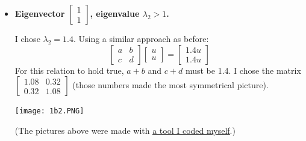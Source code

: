 \documentclass[11pt]{article}
\begin{document}
\begin{enumerate}[label=\textbf{\arabic*.}]
{\begin{enumerate}[label=\textbf{(\alph*)}]
{\begin{itemize}
{\begin{center}
                            \end{center}
                        }
                        \item{
                            \textbf{\boldmath Eigenvector $\begin{bmatrix}1 \\ 1\end{bmatrix}$, eigenvalue $\lambda_2>1$.}
                            \par
                            I chose $\lambda_2=1.4$. Using a similar approach as before:
                            \begin{equation*}
                                \begin{bmatrix}
                                    a & b \\
                                    c & d
                                \end{bmatrix}
                                \begin{bmatrix}
                                    u \\ u
                                \end{bmatrix}
                                =
                                \begin{bmatrix}
                                    1.4u \\ 1.4u
                                \end{bmatrix}
                            \end{equation*}
                            For this relation to hold true, $a+b$ and $c+d$ must be 1.4. I chose the matrix $\begin{bmatrix}1.08 & 0.32 \\ 0.32 & 1.08\end{bmatrix}$ (those numbers made the most symmetrical picture).
                            \begin{center}
                                \texttt{[image: 1b2.PNG]}
                            \end{center}
                            (The pictures above were made with \href{https://brandontsang.net/transform/}{\underline{a tool I coded myself}}.)
                        }
                    \end{itemize}
                }
            \end{enumerate}
        }
    \end{enumerate}
\end{document}
